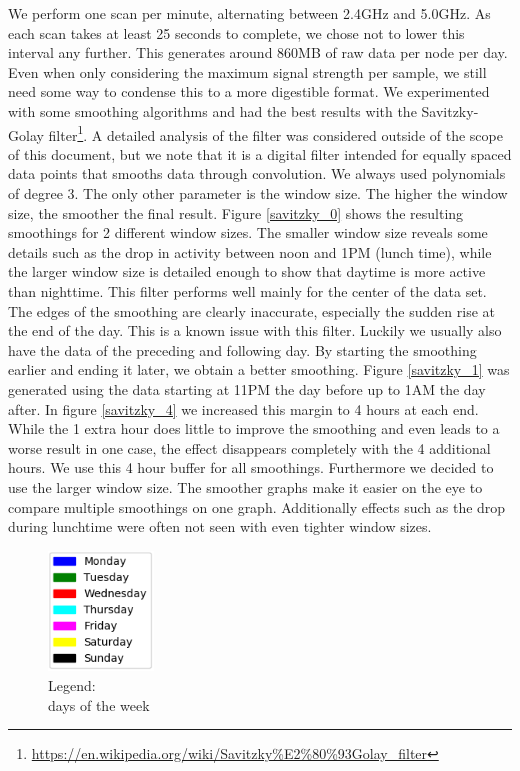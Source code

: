 \documentclass[a4paper, 11pt]{article}
\begin{document}
We perform one scan per minute, alternating between 2.4GHz and 5.0GHz. As each scan takes at least 25 seconds to complete, we chose not to lower this interval any further. This generates around 860MB of raw data per node per day. Even when only considering the maximum signal strength per sample, we still need some way to condense this to a more digestible format. We experimented with some smoothing algorithms and had the best results with the Savitzky-Golay filter\footnote{\url{https://en.wikipedia.org/wiki/Savitzky\%E2\%80\%93Golay_filter}}. A detailed analysis of the filter was considered outside of the scope of this document, but we note that it is a digital filter intended for equally spaced data points that smooths data through convolution. We always used polynomials of degree 3. The only other parameter is the window size. The higher the window size, the smoother the final result. Figure \ref{savitzky_0} shows the resulting smoothings for 2 different window sizes. The smaller window size reveals some details such as the drop in activity between noon and 1PM (lunch time), while the larger window size is detailed enough to show that daytime is more active than nighttime. This filter performs well mainly for the center of the data set. The edges of the smoothing are clearly inaccurate, especially the sudden rise at the end of the day. This is a known issue with this filter. Luckily we usually also have the data of the preceding and following day. By starting the smoothing earlier and ending it later, we obtain a better smoothing. Figure \ref{savitzky_1} was generated using the data starting at 11PM the day before up to 1AM the day after. In figure \ref{savitzky_4} we increased this margin to 4 hours at each end. While the 1 extra hour does little to improve the smoothing and even leads to a worse result in one case, the effect disappears completely with the 4 additional hours. We use this 4 hour buffer for all smoothings. Furthermore we decided to use the larger window size. The smoother graphs make it easier on the eye to compare multiple smoothings on one graph. Additionally effects such as the drop during lunchtime were often not seen with even tighter window sizes.\\
\newpage %
\begin{figure}
\centering
\captionsetup{justification=centering}
\includegraphics[width=0.25\textwidth]{legend.png}
\caption{Legend:\\ days of the week}
\label{legend}
\end{figure}
\end{document}
